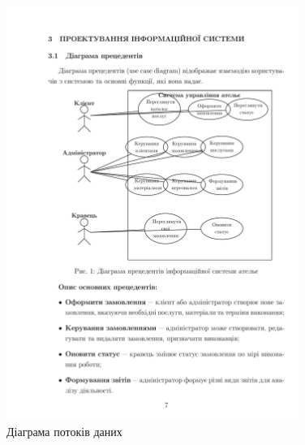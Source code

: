 \documentclass[14pt,a4paper]{extarticle}
\begin{document}
\begin{figure}[h!]
\centering
\includegraphics[width=0.85\textwidth]{diagrams/diagram-08.png}
\caption{Діаграма потоків даних}
\end{figure}
\end{document}
